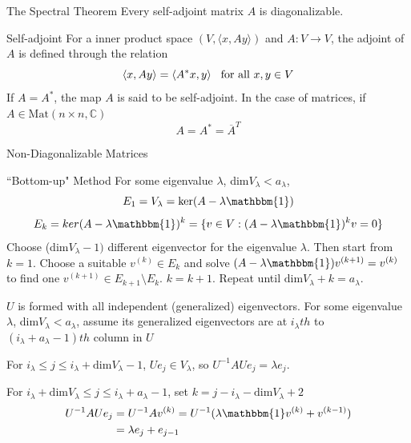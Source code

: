 \documentclass{beamer}
\begin{document}
\begin{frame}
\begin{block}{The Spectral Theorem}
Every self-adjoint matrix $A$ is diagonalizable.
\end{block}
\begin{block}{Self-adjoint}
For a inner product space $(V,\langle x,Ay\rangle)$ and $A:V\rightarrow V$, the adjoint of $A$ is defined through the relation
$$\langle x,Ay\rangle=\langle A^*x,y\rangle \hspace{3mm}\text{for all }x,y\in V$$
If $A=A^*$, the map $A$ is said to be self-adjoint. In the case of matrices, if $A\in\text{Mat}(n\times n,\mathbb{C})$
$$A=A^*=\overline{A}^T$$
\end{block}
\end{frame}

\begin{frame}
\begin{block}{Non-Diagonalizable Matrices}
\begin{block}{``Bottom-up" Method}
For some eigenvalue $ \lambda$, dim$V_{\lambda}<a_{\lambda}$,
$$E_1=V_{\lambda}=\text{ker}(A-\lambda\mathbbm{1})$$
$$E_k=ker(A-\lambda\mathbbm{1})^k=\lbrace v\in V:(A-\lambda\mathbbm{1})^kv=0\rbrace$$
Choose (dim$V_{\lambda}-1)$ different eigenvector for the eigenvalue $\lambda$. Then start from $k=1$. Choose a suitable $v^{(k)}\in E_k$ and solve $(A-\lambda\mathbbm{1})v^{(k+1)}=v^{(k)}$ to find one $v^{(k+1)}\in E_{k+1}\setminus E_k$. $k=k+1$. Repeat until $\text{dim}V_\lambda+k=a_{\lambda}$.
\end{block}
\end{block}
\end{frame}

\begin{frame}
\begin{block}

\end{block}
\begin{block}{}
$U$ is formed with all independent (generalized) eigenvectors. For some eigenvalue $\lambda$, dim$V_{\lambda}<a_{\lambda}$, assume its generalized eigenvectors are at $i_{\lambda}th$ to $(i_{\lambda}+a_{\lambda}-1)th$ column in $U$ 
\end{block}
\begin{block}{}
For $i_{\lambda}\leqslant j\leqslant i_{\lambda}+\text{dim}V_{\lambda}-1$, $Ue_j\in V_{\lambda}$, so $U^{-1}AUe_{j}=\lambda e_j$.
\end{block}
\begin{block}{}
For $i_{\lambda}+\text{dim}V_{\lambda}\leqslant j\leqslant i_{\lambda}+a_{\lambda}-1$, set $k=j-i_{\lambda}-\text{dim}V_{\lambda}+2$
\begin{align*}
U^{-1}AUe_{j}&=U^{-1}Av^{(k)}=U^{-1}(\lambda\mathbbm{1}v^{(k)}+v^{(k-1)})\\
&=\lambda e_j+e_{j-1}
\end{align*}
\end{block}

\end{frame}
\end{document}
